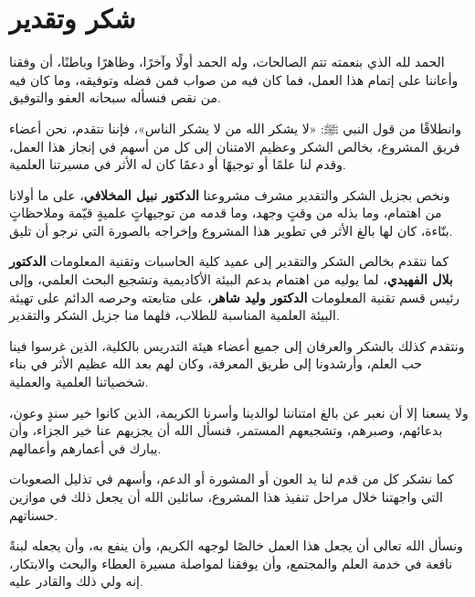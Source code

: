 \chapter*{شكر وتقدير}

الحمد لله الذي بنعمته تتم الصالحات، وله الحمد أولًا وآخرًا، وظاهرًا وباطنًا،
أن وفقنا وأعاننا على إتمام هذا العمل، فما كان فيه من صواب فمن فضله وتوفيقه،
وما كان فيه من نقص فنسأله سبحانه العفو والتوفيق.

وانطلاقًا من قول النبي ﷺ: «لا يشكر الله من لا يشكر الناس»، فإننا نتقدم، نحن
أعضاء فريق المشروع، بخالص الشكر وعظيم الامتنان إلى كل من أسهم في إنجاز هذا
العمل، وقدم لنا علمًا أو توجيهًا أو دعمًا كان له الأثر في مسيرتنا العلمية.

ونخص بجزيل الشكر والتقدير مشرف مشروعنا \textbf{الدكتور نبيل المخلافي}، على
ما أولانا من اهتمام، وما بذله من وقتٍ وجهد، وما قدمه من توجيهاتٍ علميةٍ
قيّمة وملاحظاتٍ بنّاءة، كان لها بالغ الأثر في تطوير هذا المشروع وإخراجه
بالصورة التي نرجو أن تليق.

كما نتقدم بخالص الشكر والتقدير إلى عميد كلية الحاسبات وتقنية المعلومات
\textbf{الدكتور بلال الفهيدي}، لما يوليه من اهتمام بدعم البيئة الأكاديمية
وتشجيع البحث العلمي، وإلى رئيس قسم تقنية المعلومات \textbf{الدكتور وليد
شاهر}، على متابعته وحرصه الدائم على تهيئة البيئة العلمية المناسبة للطلاب،
فلهما منا جزيل الشكر والتقدير.

ونتقدم كذلك بالشكر والعرفان إلى جميع أعضاء هيئة التدريس بالكلية، الذين
غرسوا فينا حب العلم، وأرشدونا إلى طريق المعرفة، وكان لهم بعد الله عظيم
الأثر في بناء شخصياتنا العلمية والعملية.

ولا يسعنا إلا أن نعبر عن بالغ امتناننا لوالدينا وأسرنا الكريمة، الذين كانوا
خير سندٍ وعون، بدعائهم، وصبرهم، وتشجيعهم المستمر، فنسأل الله أن يجزيهم عنا
خير الجزاء، وأن يبارك في أعمارهم وأعمالهم.

كما نشكر كل من قدم لنا يد العون أو المشورة أو الدعم، وأسهم في تذليل
الصعوبات التي واجهتنا خلال مراحل تنفيذ هذا المشروع، سائلين الله أن يجعل
ذلك في موازين حسناتهم.

ونسأل الله تعالى أن يجعل هذا العمل خالصًا لوجهه الكريم، وأن ينفع به، وأن
يجعله لبنةً نافعة في خدمة العلم والمجتمع، وأن يوفقنا لمواصلة مسيرة العطاء
والبحث والابتكار، إنه ولي ذلك والقادر عليه.

\clearpage
